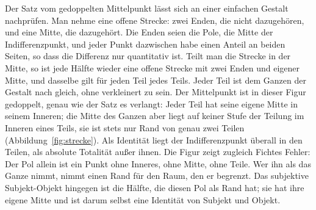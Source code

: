 \documentclass[11pt,a4paper]{article}
\newcommand{\SO}{Subjekt-Objekt}
\begin{document}
Der Satz vom gedoppelten Mittelpunkt lässt sich an einer einfachen Gestalt nachprüfen. Man nehme eine offene Strecke: zwei Enden, die nicht dazugehören, und eine Mitte, die dazugehört. Die Enden seien die Pole, die Mitte der Indifferenzpunkt, und jeder Punkt dazwischen habe einen Anteil an beiden Seiten, so dass die Differenz nur quantitativ ist. Teilt man die Strecke in der Mitte, so ist jede Hälfte wieder eine offene Strecke mit zwei Enden und eigener Mitte, und dasselbe gilt für jeden Teil jedes Teils. Jeder Teil ist dem Ganzen der Gestalt nach gleich, ohne verkleinert zu sein. Der Mittelpunkt ist in dieser Figur gedoppelt, genau wie der Satz es verlangt: Jeder Teil hat seine eigene Mitte in seinem Inneren; die Mitte des Ganzen aber liegt auf keiner Stufe der Teilung im Inneren eines Teils, sie ist stets nur Rand von genau zwei Teilen (Abbildung~\ref{fig:strecke}). Als Identität liegt der Indifferenzpunkt überall in den Teilen, als absolute Totalität außer ihnen. Die Figur zeigt zugleich Fichtes Fehler: Der Pol allein ist ein Punkt ohne Inneres, ohne Mitte, ohne Teile. Wer ihn als das Ganze nimmt, nimmt einen Rand für den Raum, den er begrenzt. Das subjektive \SO{} hingegen ist die Hälfte, die diesen Pol als Rand hat; sie hat ihre eigene Mitte und ist darum selbst eine Identität von Subjekt und Objekt.
\end{document}
